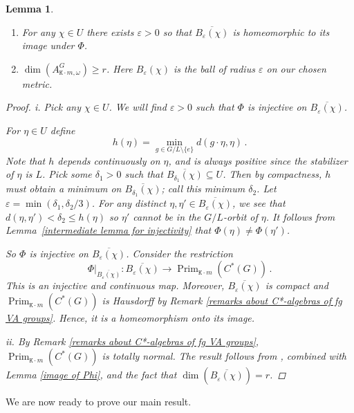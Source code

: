 \documentclass{amsart}
\newtheorem{lemma}[theorem]{Lemma}
\theoremstyle{definition}
\DeclareMathOperator{\Prim}{Prim}
\newcommand{\mt}{\mathtt}
\begin{document}
\begin{lemma}\label{injective2}

\begin{enumerate}[label=\roman*.]
    \item For any $\chi\in U$ there exists $\varepsilon>0$ so that $\overline{B_\varepsilon(\chi)}$ is homeomorphic to its image under $\Phi$.
    \item $\dim(A_{\mt{K}\cdot m,\omega}^G)\geq r$. Here $B_\varepsilon(\chi)$ is the ball of radius $\varepsilon$ on our chosen metric.  
\end{enumerate}
\begin{proof}
    {\em i.} Pick any $\chi\in U$. We will find $\varepsilon>0$ such that $\Phi$ is injective on $\overline{B_\varepsilon(\chi)}$. \par
    For $\eta\in U$ define 
$$h(\eta)=\min_{g\in G/L\setminus\{e\}}d(g\cdot\eta,\eta)\,.$$ 
Note that $h$ depends continuously on $\eta$, and is always positive since the stabilizer of $\eta$ is $L$. Pick some $\delta_1>0$ such that $\overline{B_{\delta_1}(\chi)}\subseteq U$. Then by compactness, $h$ must obtain a minimum on $\overline{B_{\delta_1}(\chi)}$; call this minimum $\delta_2$. Let $\varepsilon=\min(\delta_1,\delta_2/3)$. For any distinct $\eta,\eta'\in\overline{B_\varepsilon(\chi)}$, we see that $d(\eta,\eta')<\delta_2\le h(\eta)$ so $\eta'$ cannot be in the $G/L$-orbit of $\eta$. It follows from Lemma~\ref{intermediate lemma for injectivity} that $\Phi(\eta)\ne\Phi(\eta')$. \par
So $\Phi$ is injective on $\overline{B_\varepsilon(\chi)}$. Consider the restriction $$\Phi|_{\overline{B_{\varepsilon}(\chi)}}\colon \overline{B_{\varepsilon}(\chi)}\to \Prim_{\mt{K}\cdot m}(C^*(G))\,.$$
This is an injective and continuous map. Moreover, $\overline{B_{\varepsilon}(\chi)}$ is compact and $\Prim_{\mt{K}\cdot m}(C^*(G))$ is Hausdorff by Remark \ref{remarks about C*-algebras of fg VA groups}. Hence, it is a homeomorphism onto its image. 


{\em ii.} By Remark \ref{remarks about C*-algebras of fg VA groups}, $\Prim_{\mt{K}\cdot m}(C^*(G))$ is totally normal. The result follows from \cite[Theorem 6.4]{Pea75}, combined with Lemma \ref{image of Phi}, and the fact that $\dim(\overline{B_{\varepsilon}(\chi)})=r$.
\end{proof}
\end{lemma}
We are now ready to prove our main result.
\end{document}
